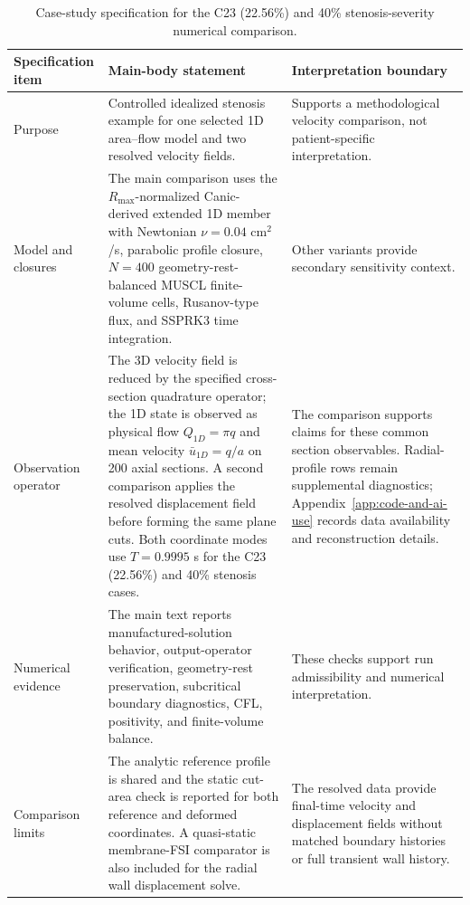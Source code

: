 \begin{table}[!htb]
    \centering
    \scriptsize
    \caption{Case-study specification for the C23 (22.56\%) and 40\%
    stenosis-severity numerical comparison.}
    \label{tab:t1-case-study-contract}
    \begin{tabularx}{\textwidth}{@{}
        >{\raggedright\arraybackslash}p{}
        >{\raggedright\arraybackslash}p{}
        >{\raggedright\arraybackslash}X@{}}
        \toprule
        \textbf{Specification item}
            & \textbf{Main-body statement}
            & \textbf{Interpretation boundary} \\
        \midrule
        Purpose
            & Controlled idealized stenosis example for one selected 1D
            area--flow model and two resolved velocity fields.
            & Supports a methodological velocity comparison, not
            patient-specific interpretation. \\
        Model and closures
            & The main comparison uses the $R_{\max}$-normalized
            Canic-derived extended 1D member with Newtonian
            $\nu=0.04$ cm$^2$/s, parabolic profile closure, $N=400$
            geometry-rest-balanced MUSCL finite-volume cells, Rusanov-type
            flux, and SSPRK3 time integration.
            & Other variants provide secondary sensitivity context. \\
        Observation operator
            & The 3D velocity field is reduced by the specified
            cross-section quadrature operator; the 1D state is observed as
            physical flow $Q_{1D}=\pi q$ and mean velocity
            $\bar u_{1D}=q/a$ on 200 axial sections. A second
            comparison applies the resolved displacement field before forming
            the same plane cuts. Both coordinate modes use
            $T=0.9995$ s for the C23 (22.56\%) and 40\% stenosis cases.
            & The comparison supports claims for these common section
            observables. Radial-profile rows remain supplemental diagnostics;
            Appendix~\ref{app:code-and-ai-use} records data availability and
            reconstruction details. \\
        Numerical evidence
            & The main text reports manufactured-solution behavior,
            output-operator verification, geometry-rest preservation, subcritical
            boundary diagnostics, CFL, positivity, and finite-volume
            balance.
            & These checks support run admissibility and numerical
            interpretation. \\
        Comparison limits
            & The analytic reference profile is shared and the static cut-area
            check is reported for both reference and deformed coordinates. A
            quasi-static membrane-FSI comparator is also included for the
            radial wall displacement solve.
            & The resolved data provide final-time velocity and displacement
            fields without matched boundary histories or full transient wall
            history. \\
        \bottomrule
    \end{tabularx}
\end{table}


